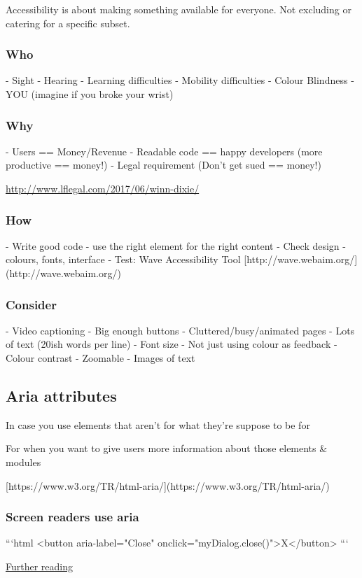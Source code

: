 Accessibility is about making something available for everyone. Not excluding or catering for a specific subset.

\subsubsection{Who}

- Sight
- Hearing
- Learning difficulties
- Mobility difficulties
- Colour Blindness
- YOU (imagine if you broke your wrist)


\subsubsection{Why}

- Users == Money/Revenue
- Readable code == happy developers (more productive == money!)
- Legal requirement (Don’t get sued == money!)

\href{http://www.lflegal.com/2017/06/winn-dixie/}{http://www.lflegal.com/2017/06/winn-dixie/}

\subsubsection{How}

- Write good code - use the right element for the right content
- Check design - colours, fonts, interface
- Test: Wave Accessibility Tool [http://wave.webaim.org/](http://wave.webaim.org/)


\subsubsection{Consider}

- Video captioning
- Big enough buttons
- Cluttered/busy/animated pages
- Lots of text (20ish words per line)
- Font size
- Not just using colour as feedback
- Colour contrast
- Zoomable
- Images of text

\subsection{Aria attributes}

In case you use elements that aren't for what they're suppose to be for

For when you want to give users more information about those elements \& modules

[https://www.w3.org/TR/html-aria/](https://www.w3.org/TR/html-aria/)

\subsubsection{Screen readers use aria}

```html
<button aria-label="Close" onclick="myDialog.close()">X</button>
```

\href{http://www.heydonworks.com/article/aria-label-is-a-xenophobe}{Further reading}


